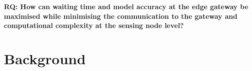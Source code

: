 \documentclass{mpaper}
\begin{document}

\textbf{RQ: How can waiting time and model accuracy at the edge gateway be maximised while minimising the communication to the gateway and computational complexity at the sensing node level?}

\section{Background}
\end{document}
